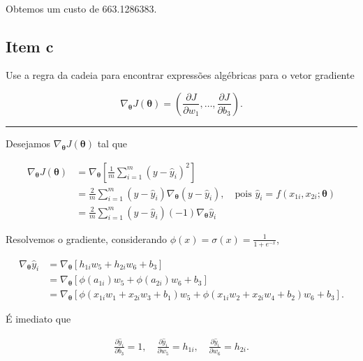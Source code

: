 \documentclass[
  a4paperpaper,
]{article}
\begin{document}
~

Obtemos um custo de 663.1286383.

\subsection{Item c}\label{item-c}

Use a regra da cadeia para encontrar expressões algébricas para o vetor
gradiente

\[
\nabla_{\boldsymbol{\theta}}J(\boldsymbol{\theta}) = \left( \frac{\partial J}{\partial w_1}, \dots, \frac{\partial J}{\partial b_3} \right).
\]

\begin{center}\rule{0.5\linewidth}{0.5pt}\end{center}

Desejamos \(\nabla_{\boldsymbol{\theta}}J(\boldsymbol{\theta})\) tal que

\begin{align}
  \nabla_{\boldsymbol{\theta}}J(\boldsymbol{\theta}) &= \nabla_{\boldsymbol{\theta}} \left[ \frac{1}{m} \sum\limits^m_{i = 1} (y - \hat{y}_i)^2 \right] \nonumber \\
  &= \frac{2}{m} \sum\limits^m_{i = 1} (y - \hat{y}_i) \nabla_{\boldsymbol{\theta}} (y - \hat{y}_i), \quad \text{pois } \hat{y}_i = f(x_{1i}, x_{2i}; \boldsymbol{\theta}) \nonumber \\
  &= \frac{2}{m} \sum\limits^m_{i = 1} (y - \hat{y}_i) (-1) \nabla_{\boldsymbol{\theta}} \hat{y}_i \label{101}
\end{align}

Resolvemos o gradiente, considerando
\(\phi(x) = \sigma(x) = \frac{1}{1+ e^{-x}}\),

\begin{align*}
  \nabla_{\boldsymbol{\theta}} \hat{y}_i &= \nabla_{\boldsymbol{\theta}} \left[ h_{1i} w_5 + h_{2i} w_6 + b_3 \right] \\
  &= \nabla_{\boldsymbol{\theta}} \left[ \phi(a_{1i}) w_5 + \phi(a_{2i}) w_6 + b_3 \right] \\
  &= \nabla_{\boldsymbol{\theta}} \left[ \phi(x_{1i} w_1 + x_{2i} w_3 + b_1) w_5 + \phi(x_{1i} w_2 + x_{2i} w_4 + b_2) w_6 + b_3 \right].
\end{align*}

É imediato que

\begin{align*}
  \frac{\partial \hat{y}_i}{\partial b_3} = 1, \quad \frac{\partial \hat{y}_i}{\partial w_5} = h_{1i}, \quad \frac{\partial \hat{y}_i}{\partial w_6} = h_{2i}.
\end{align*}
\end{document}
